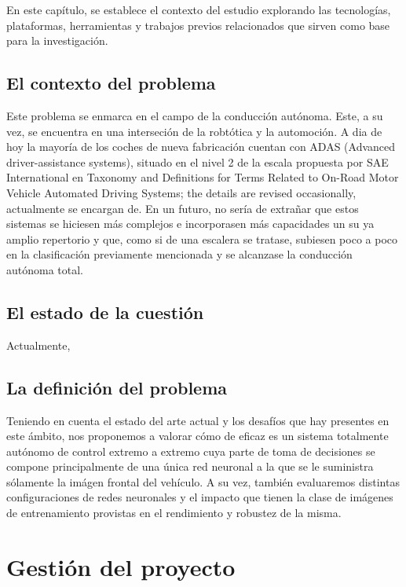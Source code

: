 \documentclass[12pt,a4paper,onecolumn,oneside]{report}
\begin{document}
En este capítulo, se establece el contexto del estudio explorando las tecnologías, plataformas, herramientas y trabajos previos relacionados que sirven como base para la investigación.

\section{El contexto del problema}

Este problema se enmarca en el campo de la conducción autónoma. Este, a su vez, se encuentra en una interseción de la robtótica y la automoción. A dia de hoy la mayoría de los coches de nueva fabricación cuentan con ADAS (Advanced driver-assistance systems), situado en el nivel 2 de la escala propuesta por SAE International en Taxonomy and Definitions for Terms Related to On-Road Motor Vehicle Automated Driving Systems; the details are revised occasionally, actualmente se encargan de. En un futuro, no sería de extrañar que estos sistemas se hiciesen más complejos e incorporasen más capacidades un su ya amplio repertorio y que, como si de una escalera se tratase, subiesen poco a poco en la clasificación previamente mencionada y se alcanzase la conducción autónoma total. 

\section{El estado de la cuestión}

Actualmente,


\section{La definición del problema}

Teniendo en cuenta el estado del arte actual y los desafíos que hay presentes en este ámbito, nos proponemos a valorar cómo de eficaz es un sistema totalmente autónomo de control extremo a extremo cuya parte de toma de decisiones se compone principalmente de una única red neuronal a la que se le suministra sólamente la imágen frontal del vehículo. A su vez, también evaluaremos distintas configuraciones de redes neuronales y el impacto que tienen la clase de imágenes de entrenamiento provistas en el rendimiento y robustez de la misma.

\chapter{Gestión del proyecto}
\label{Gestión del proyecto}
\end{document}
